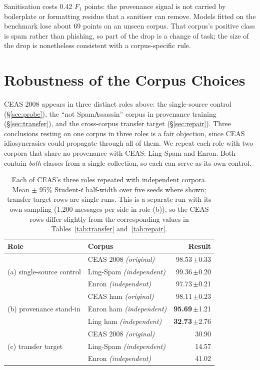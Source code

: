\documentclass[twoside,11pt]{article}
\newcommand{\gd}[1]{\textbf{#1}}
\begin{document}
Sanitisation costs 0.42 $F_1$ points: the provenance signal is not carried
by boilerplate or formatting residue that a sanitiser can remove. Models fitted
on the benchmark lose about 69 points on an unseen corpus. That corpus's
positive class is spam rather than phishing, so part of the drop is a change
of task; the size of the drop is nonetheless consistent with a
corpus-specific rule.

\section{Robustness of the Corpus Choices}
\label{sec:independence}

CEAS 2008 appears in three distinct roles above: the single-source control
(\S\ref{sec:probe}), the ``not SpamAssassin'' corpus in provenance training
(\S\ref{sec:transfer}), and the cross-corpus transfer target
(\S\ref{sec:repair}). Three conclusions resting on one corpus in three roles
is a fair objection, since CEAS idiosyncrasies could propagate through all of
them. We repeat each role with two corpora that share no provenance with CEAS:
Ling-Spam and Enron. Both contain \emph{both} classes from a single
collection, so each can serve as its own control.

\begin{table}[t]
\centering\small
\caption{Each of CEAS's three roles repeated with independent corpora. Mean
$\pm$ 95\% Student-$t$ half-width over five seeds where shown; transfer-target
rows are single runs. This is a separate run with its own sampling (1{,}200
messages per side in role (b)), so the CEAS rows differ slightly from the
corresponding values in Tables~\ref{tab:transfer} and~\ref{tab:repair}.}
\label{tab:independence}
\begin{tabular}{llr}
\toprule
Role & Corpus & Result \\
\midrule
\multirow{3}{*}{(a) single-source control}
 & CEAS 2008 \emph{(original)} & 98.53\,$\pm$0.33 \\
 & Ling-Spam \emph{(independent)} & 99.36\,$\pm$0.20 \\
 & Enron \emph{(independent)} & 97.73\,$\pm$0.21 \\
\midrule
\multirow{3}{*}{(b) provenance stand-in}
 & CEAS ham \emph{(original)} & 98.11\,$\pm$0.23 \\
 & Enron ham \emph{(independent)} & \gd{95.69}\,$\pm$1.21 \\
 & Ling ham \emph{(independent)} & \gd{32.73}\,$\pm$2.76 \\
\midrule
\multirow{3}{*}{(c) transfer target}
 & CEAS 2008 \emph{(original)} & 30.90 \\
 & Ling-Spam \emph{(independent)} & 14.57 \\
 & Enron \emph{(independent)} & 41.02 \\
\bottomrule
\end{tabular}
\end{table}
\end{document}

